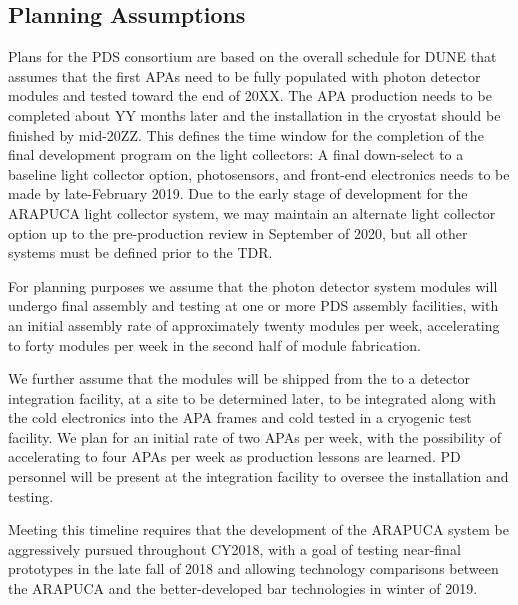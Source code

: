 \subsection{Planning Assumptions}
\label{sec:fdsp-pd-org-assmp}


Plans for the PDS consortium are based on the overall schedule for DUNE that assumes that the first APAs need to be fully populated with photon detector modules and tested toward the end of 20XX. The APA production needs to be completed about YY months later and the installation in the cryostat should be
finished by mid-20ZZ.  This defines the time window for the completion of the final development program on the light collectors: A final down-select to a baseline light collector option, photosensors, and front-end electronics needs to be made by late-February 2019.  Due to the early stage of development for the ARAPUCA light collector system, we may maintain an alternate light collector option up to the pre-production review in September of 2020, but all other systems must be defined prior to the TDR. 

For planning purposes we assume that the photon detector system modules will undergo final assembly and testing at one or more PDS assembly facilities, with an initial  assembly rate of approximately twenty modules per week, accelerating to forty modules per week in the second half of module fabrication.

We further assume that the modules will be shipped from the to a detector integration facility, at a site to be determined later, to be integrated along with the cold electronics into the APA frames and cold tested in a cryogenic test facility.  We plan for an initial rate of two APAs per week, with the possibility of accelerating to four APAs per week as production lessons are learned.  PD personnel will be present at the integration facility to oversee the installation and testing.

Meeting this timeline requires that the development of the ARAPUCA system be aggressively pursued throughout CY2018, with a goal of testing near-final prototypes in the late fall of \num{2018} and allowing technology comparisons between the ARAPUCA and the better-developed bar technologies in winter of \num{2019}.


